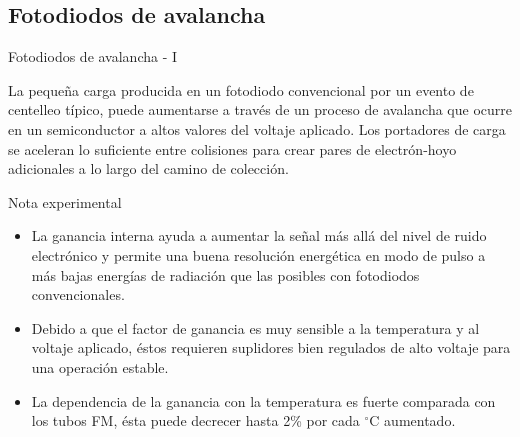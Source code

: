 \documentclass[a4paper,10pt]{beamer}
\begin{document}
\subsection{Fotodiodos de avalancha}
\begin{frame}{Fotodiodos de avalancha - I}
 \begin{justify}
 La pequeña carga producida en un fotodiodo convencional por un evento de centelleo 
 típico, puede aumentarse a través de un proceso de avalancha que ocurre en un 
 semiconductor a altos valores del voltaje aplicado. Los portadores de carga se 
 aceleran lo suficiente entre colisiones para crear pares de electrón-hoyo adicionales 
 a lo largo del camino de colección. 
 \end{justify}
 
 \begin{exampleblock}{Nota experimental}
  \begin{itemize}
   \item \begin{justify}
          La ganancia interna ayuda a aumentar la señal más allá del nivel de 
          ruido electrónico y permite una buena resolución energética en modo 
          de pulso a más bajas energías de radiación que las posibles con 
          fotodiodos convencionales.
         \end{justify}
    \item \begin{justify}
         Debido a que el factor de ganancia es muy sensible a la temperatura y 
         al voltaje aplicado, éstos requieren suplidores bien regulados de 
         alto voltaje para una operación estable.
         \end{justify}
     \item \begin{justify}
         La dependencia de la ganancia con la temperatura es fuerte comparada con 
         los tubos FM, ésta puede decrecer hasta 2\% por cada $^\circ$C aumentado.
         \end{justify}
  \end{itemize}

 \end{exampleblock}
 
\end{frame}
\end{document}
